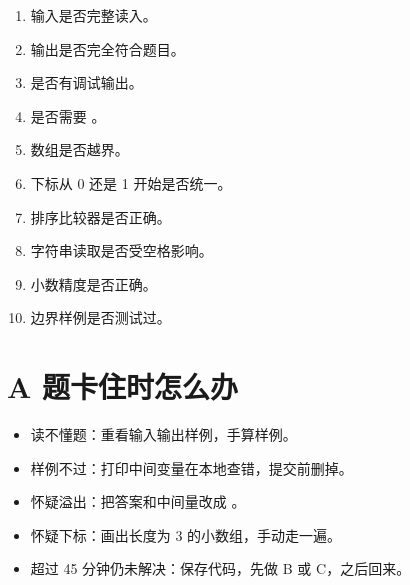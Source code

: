 \begin{enumerate}
  \item 输入是否完整读入。
  \item 输出是否完全符合题目。
  \item 是否有调试输出。
  \item 是否需要 。
  \item 数组是否越界。
  \item 下标从 0 还是 1 开始是否统一。
  \item 排序比较器是否正确。
  \item 字符串读取是否受空格影响。
  \item 小数精度是否正确。
  \item 边界样例是否测试过。
\end{enumerate}

\section{A 题卡住时怎么办}\label{sec:05-29}

\begin{itemize}
  \item 读不懂题：重看输入输出样例，手算样例。
  \item 样例不过：打印中间变量在本地查错，提交前删掉。
  \item 怀疑溢出：把答案和中间量改成 。
  \item 怀疑下标：画出长度为 3 的小数组，手动走一遍。
  \item 超过 45 分钟仍未解决：保存代码，先做 B 或 C，之后回来。
\end{itemize}

